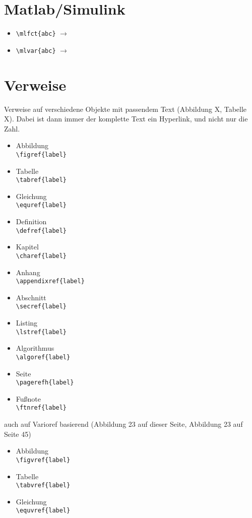 \section*{Matlab/Simulink}
\begin{itemize}
	\item \verb|| $\rightarrow$ \mlfct{abc}
	\item \verb|| $\rightarrow$ \mlvar{abc}
\end{itemize}



\section*{Verweise}
Verweise auf verschiedene Objekte mit passendem Text (\glqq{}Abbildung X\grqq{}, \glqq{}Tabelle X\grqq{}).
Dabei ist dann immer der komplette Text ein Hyperlink, und nicht nur die Zahl.
\begin{itemize}
	\item Abbildung\\ \verb|\figref{label}|
	\item Tabelle\\ \verb|\tabref{label}|
	\item Gleichung\\ \verb|\equref{label}|
	\item Definition\\ \verb|\defref{label}|
	\item Kapitel\\ \verb|\charef{label}|
	\item Anhang\\ \verb|\appendixref{label}|
	\item Abschnitt\\ \verb|\secref{label}|
	\item Listing\\ \verb|\lstref{label}|
	\item Algorithmus\\ \verb|\algoref{label}|
	\item Seite\\ \verb|\pagerefh{label}|
	\item Fußnote\\ \verb|\ftnref{label}|
\end{itemize}

\ZT auch auf Varioref basierend (\glqq{}Abbildung 23 auf dieser Seite\grqq{}, \glqq{}Abbildung 23 auf Seite 45\grqq)
\begin{itemize}
	\item Abbildung\\ \verb|\figvref{label}|
	\item Tabelle\\ \verb|\tabvref{label}|
	\item Gleichung\\ \verb|\equvref{label}|
\end{itemize}


